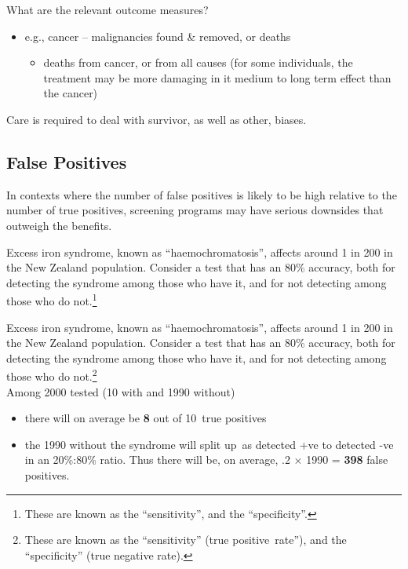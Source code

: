 \documentclass[
  10pt,
  b5paper]{book}
\providecommand{\tightlist}{%
  \setlength{\itemsep}{0pt}\setlength{\parskip}{0pt}}
\begin{document}
What are the relevant outcome measures?

\begin{itemize}
\tightlist
\item
  e.g., cancer -- malignancies found \& removed, or deaths

  \begin{itemize}
  \tightlist
  \item
    deaths from cancer, or from all causes (for some individuals,
    the treatment may be more damaging in it medium to long term
    effect than the cancer)
  \end{itemize}
\end{itemize}

Care is required to deal with survivor, as well as other, biases.

\hypertarget{false-positives}{%
\subsection{False Positives}\label{false-positives}}

In contexts where the number of false positives is likely to be high
relative to the number of true positives, screening programs may have
serious downsides that outweigh the benefits.

Excess iron syndrome, known as ``haemochromatosis'', affects around 1 in
200 in the New Zealand population. Consider a test that has an 80\%
accuracy, both for detecting the syndrome among those who have it, and
for not detecting among those who do not.\footnote{These are known as the ``sensitivity'', and the
  ``specificity''.}

Excess iron syndrome, known as ``haemochromatosis'', affects around 1 in
200 in the New Zealand population. Consider a test that has an 80\%
accuracy, both for detecting the syndrome among those who have it, and
for not detecting among those who do not.\footnote{These are known as the ``sensitivity'' (true
  positive~rate''), and the ``specificity'' (true negative rate).}\\
Among 2000 tested (10 with and 1990 without)

\begin{itemize}
\tightlist
\item
  there will on average be \textbf{8} out of 10~true positives
\item
  the 1990 without the syndrome will split up~as detected +ve to
  detected -ve in an 20\%:80\% ratio. Thus there will be, on average, .2
  \(\times\) 1990 = \textbf{398} false positives.
\end{itemize}
\end{document}
